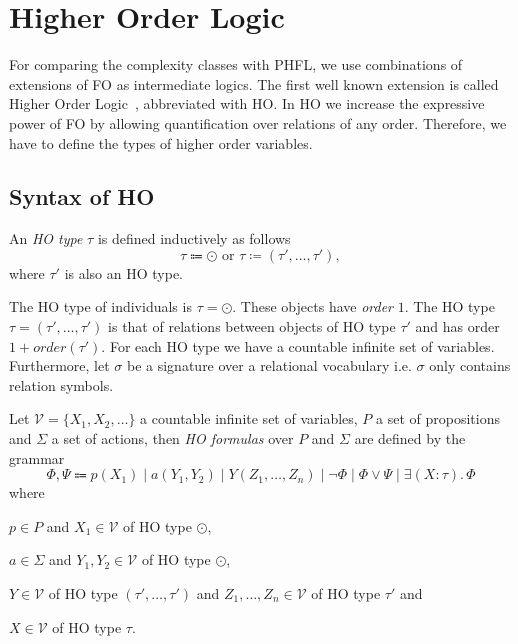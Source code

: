 

\section{Higher Order Logic}\label{sec:higherOrderLogic}

For comparing the complexity classes with PHFL, we use combinations of extensions of FO as intermediate logics. The first well
known extension is called Higher Order Logic~\cite{vanBenthem2001higher}, abbreviated with HO. In HO we
increase the expressive power of FO by allowing quantification over relations of any order. Therefore, we have to define the
types of higher order variables.

\subsection{Syntax of HO}\label{subsec:hoSyntax}

\begin{definition}
    An \emph{HO type} $\tau$ is defined inductively as follows
    \[ \tau \Coloneqq \odot \text{ or } \tau \coloneqq (\tau', \dots, \tau'), \]
    where $\tau'$ is also an HO type.
\end{definition}

The HO type of individuals is $\tau = \odot$. These objects have \textit{order} $1$. The HO type $\tau = (\tau',
\dots, \tau')$ is that of relations between objects of HO type $\tau'$ and has order $1 + order(\tau')$. For
each HO type we have a countable infinite set of variables. Furthermore, let $\sigma$ be a signature over a
relational vocabulary i.e. $\sigma$ only contains relation symbols.

\begin{definition}
    Let $\mathcal{V} = \{X_1, X_2, \dots \}$ a countable infinite set of variables, $P$ a set of propositions and $\Sigma$ a set of actions, then \emph{HO
    formulas} over $P$ and $\Sigma$ are defined by the grammar
    \[\Phi, \Psi \Coloneqq p(X_1) \mid a(Y_1, Y_2) \mid Y(Z_1, \dots, Z_n) \mid \neg \Phi \mid \Phi \vee \Psi \mid \exists
    (X \colon \tau).\,\Phi\]
    where
    \begin{compactitem}
        \item $p \in P$ and $X_1 \in \mathcal{V}$ of HO type $\odot$,
        \item $a \in \Sigma$ and $Y_1, Y_2 \in \mathcal{V}$ of HO type $\odot$,
        \item $Y \in \mathcal{V}$ of HO type $(\tau', \dots, \tau')$ and $Z_1, \dots, Z_n \in \mathcal{V}$ of HO type $\tau'$ and
        \item $X \in \mathcal{V}$ of HO type $\tau$.
    \end{compactitem}
\end{definition}

